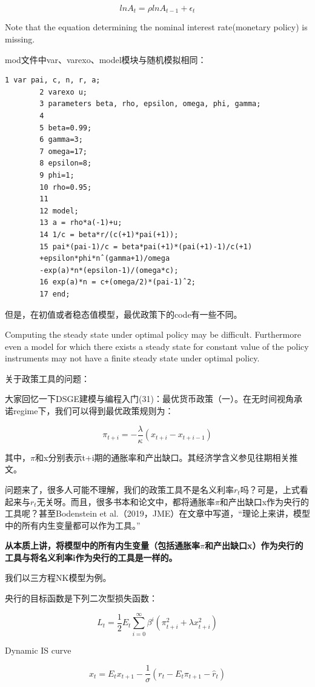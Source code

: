 \documentclass[10pt,math=newtx,citestyle=gb7714-2015,bibstyle=gb7714-2015]{elegantbook}
\begin{document}
{	$$lnA_t=\rho lnA_{t-1}+\epsilon_t$$
	
	Note that the equation determining the nominal interest rate(monetary policy) is missing.
	
	mod文件中var、varexo、model模块与随机模拟相同：
	
	\begin{lstlisting}[frame=shadowbox]
		1 var pai, c, n, r, a;
		2 varexo u;
		3 parameters beta, rho, epsilon, omega, phi, gamma;
		4
		5 beta=0.99;
		6 gamma=3;
		7 omega=17;
		8 epsilon=8;
		9 phi=1;
		10 rho=0.95;
		11
		12 model;
		13 a = rho*a(-1)+u;
		14 1/c = beta*r/(c(+1)*pai(+1));
		15 pai*(pai-1)/c = beta*pai(+1)*(pai(+1)-1)/c(+1)
		+epsilon*phi*nˆ(gamma+1)/omega
		-exp(a)*n*(epsilon-1)/(omega*c);
		16 exp(a)*n = c+(omega/2)*(pai-1)ˆ2;
		17 end;
	\end{lstlisting}
	
	但是，在初值或者稳态值模型，最优政策下的code有一些不同。
	
	Computing the steady state under optimal policy may be difficult. Furthermore even a model for which there exists a steady state for constant value of the policy instruments
	may not have a finite steady state under optimal policy.
	
	关于政策工具的问题：
	
	大家回忆一下DSGE建模与编程入门(31)：最优货币政策（一）。在无时间视角承诺regime下，我们可以得到最优政策规则为：
	
	$$\pi_{t+i}=-\frac{\lambda}{\kappa}(x_{t+i}-x_{t+i-1})$$
	
	其中，$\pi$和x分别表示t+i期的通胀率和产出缺口。其经济学含义参见往期相关推文。
	
	问题来了，很多人可能不理解，我们的政策工具不是名义利率$r_t$吗？可是，上式看起来与$r_t$无关呀。而且，很多书本和论文中，都将通胀率$\pi$和产出缺口x作为央行的工具呢？甚至Bodenstein et al.（2019，JME）在文章中写道，“理论上来讲，模型中的所有内生变量都可以作为工具。”
	
	\textbf{从本质上讲，将模型中的所有内生变量（包括通胀率$\pi$和产出缺口x）作为央行的工具与将名义利率i作为央行的工具是一样的。}
	
	我们以三方程NK模型为例。
	
	央行的目标函数是下列二次型损失函数：
	
	$$L_t=\frac{1}{2}E_t \sum_{i=0}^{\infty}\beta^{i}(\pi_{t+i}^2+\lambda x_{t+i}^2)$$
	
	Dynamic IS curve
	
	$$x_t=E_tx_{t+1}-\frac{1}{\sigma}(r_t-E_t\pi_{t+1}-\hat{r}_t)$$
	
}
\end{document}
